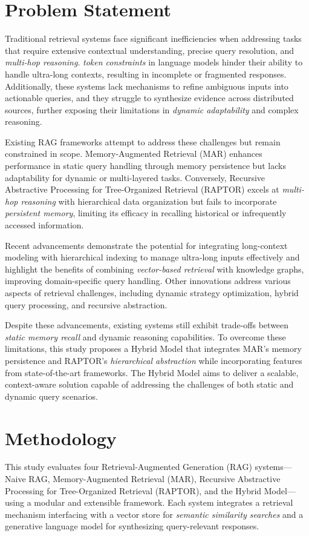 \documentclass[pdflatex,sn-mathphys-num]{sn-jnl}%
\begin{document}
\section{Problem Statement}\label{sec2}
Traditional retrieval systems face significant inefficiencies when addressing tasks that require extensive contextual understanding, precise query resolution, and \emph{multi-hop reasoning}. \emph{token constraints} in language models hinder their ability to handle ultra-long contexts, resulting in incomplete or fragmented responses. Additionally, these systems lack mechanisms to refine ambiguous inputs into actionable queries, and they struggle to synthesize evidence across distributed sources, further exposing their limitations in \emph{dynamic adaptability} and complex reasoning.

Existing RAG frameworks attempt to address these challenges but remain constrained in scope. Memory-Augmented Retrieval (MAR) enhances performance in static query handling through memory persistence but lacks adaptability for dynamic or multi-layered tasks. Conversely, Recursive Abstractive Processing for Tree-Organized Retrieval (RAPTOR) excels at \emph{multi-hop reasoning} with hierarchical data organization but fails to incorporate \emph{persistent memory}, limiting its efficacy in recalling historical or infrequently accessed information.

Recent advancements demonstrate the potential for integrating long-context modeling with hierarchical indexing to manage ultra-long inputs effectively and highlight the benefits of combining \emph{vector-based retrieval} with knowledge graphs, improving domain-specific query handling. Other innovations address various aspects of retrieval challenges, including dynamic strategy optimization, hybrid query processing, and recursive abstraction.

Despite these advancements, existing systems still exhibit trade-offs between \emph{static memory recall} and dynamic reasoning capabilities. To overcome these limitations, this study proposes a Hybrid Model that integrates MAR’s memory persistence and RAPTOR’s \emph{hierarchical abstraction} while incorporating features from state-of-the-art frameworks. The Hybrid Model aims to deliver a scalable, context-aware solution capable of addressing the challenges of both static and dynamic query scenarios.


\section{Methodology}\label{sec3}
This study evaluates four Retrieval-Augmented Generation (RAG) systems—Naive RAG, Memory-Augmented Retrieval (MAR), Recursive Abstractive Processing for Tree-Organized Retrieval (RAPTOR), and the Hybrid Model—using a modular and extensible framework. Each system integrates a retrieval mechanism interfacing with a vector store for \emph{semantic similarity searches} and a generative language model for synthesizing query-relevant responses.
\end{document}
